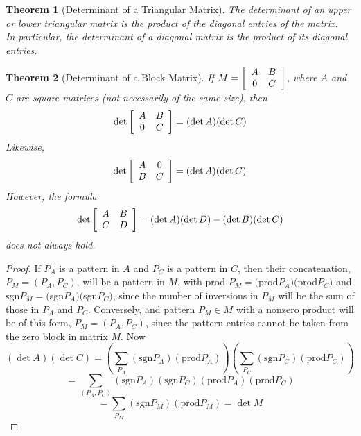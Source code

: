 \documentclass[10pt]{report}
\newtheorem{thm2}{Theorem}[section]
\begin{document}
\begin{thm2}[Determinant of a Triangular Matrix]
The determinant of an upper or lower triangular matrix is the product of the diagonal entries of the matrix.\\
In particular, the determinant of a diagonal matrix is the product of its diagonal entries.
\end{thm2}
\begin{thm2}[Determinant of a Block Matrix]
If $M=\left[\begin{array}{c c}
A & B\\
0 & C
\end{array}\right]$, where $A$ and $C$ are square matrices (not necessarily of the same size), then
$$\det \left[\begin{array}{c c}
A & B\\
0 & C
\end{array}\right] = (\det A)(\det C)$$
Likewise,
$$\det\left[\begin{array}{c c}
A & 0\\
B & C
\end{array}\right] = (\det A)(\det C)$$
However, the formula
$$\det \left[\begin{array}{c c}
A & B\\
C & D
\end{array}\right] = (\det A)(\det D)-(\det B)(\det C)$$
does not always hold.
\end{thm2}
\begin{proof}
If $P_A$ is a pattern in $A$ and $P_C$ is a pattern in $C$, then their concatenation, $P_M = (P_A, P_C)$, will be a pattern in $M$, with prod $P_M= ($prod$P_A)($prod$P_C)$ and sgn$P_M=($sgn$P_A)($sgn$P_C)$, since the number of inversions in $P_M$ will be the sum of those in $P_A$ and $P_C$. Conversely, and pattern $P_M\in M$ with a nonzero product will be of this form, $P_M=(P_A, P_C)$, since the pattern entries cannot be taken from the zero block in matrix $M$. Now
$$(\det A)(\det C) = \left( \sum_{P_A}(\text{sgn}P_A)(\text{prod}P_A)\right)\left( \sum_{P_C}(\text{sgn}P_C)(\text{prod} P_C)\right)$$
$$=\sum_{(P_A,P_C)}(\text{sgn}P_A) (\text{sgn}P_C) (\text{prod}P_A) (\text{prod}P_C)$$
$$=\sum_{P_M}(\text{sgn}P_M) (\text{prod}P_M)=\det M$$
\end{proof}
\end{document}
